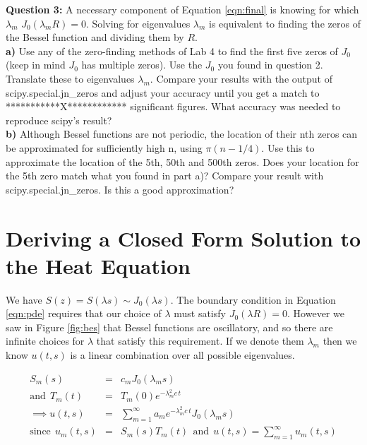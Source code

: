 \documentclass[a4paper,12pt]{article}
\begin{document}
\textbf{Question 3:} A necessary component of Equation \ref{eqn:final} is knowing for which $\lambda_m$ $J_0(\lambda_m R) = 0$. Solving for eigenvalues $\lambda_m$ is equivalent to finding the zeros of the Bessel function and dividing them by $R$.\\
\textbf{a)} Use any of the zero-finding methods of Lab 4 to find the first five zeros of $J_0$ (keep in mind $J_0$ has multiple zeros). Use the $J_0$ you found in question 2. Translate these to eigenvalues $\lambda_m$. Compare your results with the output of scipy.special.jn\_zeros and adjust your accuracy until you get a match to ***********X************ significant figures. What accuracy was needed to reproduce scipy's result?\\
\textbf{b)} Although Bessel functions are not periodic, the location of their nth zeros can be approximated for sufficiently high n, using $\pi\left(n-1/4\right)$. Use this to approximate the location of the 5th, 50th and 500th zeros. Does your location for the 5th zero match what you found in part a)? Compare your result with scipy.special.jn\_zeros. Is this a good approximation?  \\


\appendix

\section{Deriving a Closed Form Solution to the Heat Equation}
\label{app:deriv}

We have $S(z) = S(\lambda s) \sim J_0(\lambda s)$. The boundary condition in Equation \ref{eqn:pde} requires that our choice of $\lambda$ must satisfy $J_0(\lambda R) = 0$. However we saw in Figure \ref{fig:bes} that Bessel functions are oscillatory, and so there are infinite choices for $\lambda$ that satisfy this requirement. If we denote them $\lambda_m$ then we know $u(t,s)$ is a linear combination over all possible eigenvalues.

\begin{eqnarray}
S_m(s) &=& c_m J_0(\lambda_m s)\nonumber\\
\mathrm{and}\:\: T_m(t) &=& T_m(0)e^{-\lambda_m^2 c\,t}\nonumber\\
\implies u(t,s) &=& \sum_{m=1}^{\infty}a_m e^{-\lambda_m^2 c\,t} J_0(\lambda_m s)\nonumber\\
\mathrm{since}\:\: u_m(t,s) &=& S_m(s)T_m(t)\:\:\mathrm{and}\:\: u(t,s) = \sum_{m=1}^{\infty}u_m(t,s)\nonumber 
\end{eqnarray}
\end{document}
